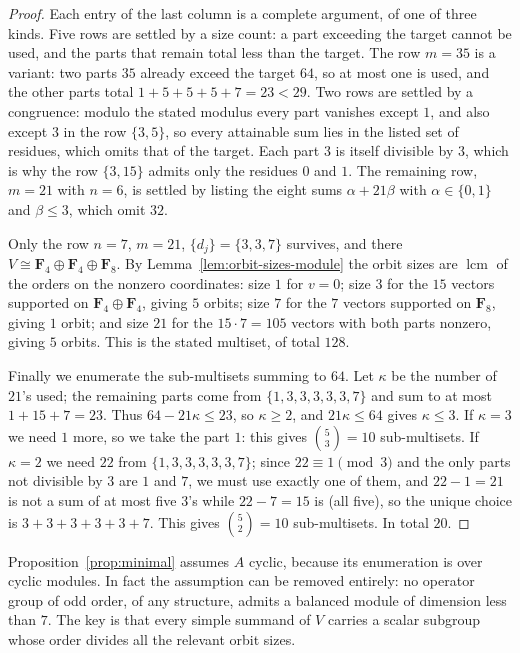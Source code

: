 \documentclass[11pt]{article}
\theoremstyle{definition}
\theoremstyle{remark}
\newcommand{\F}{\mathbf F}
\begin{document}
\begin{proof}
Each entry of the last column is a complete argument, of one of three
kinds.  Five rows are settled by a size count: a part exceeding the
target cannot be used, and the parts that remain total less than the
target.  The row $m=35$ is a variant: two parts $35$ already exceed the
target $64$, so at most one is used, and the other parts total
$1+5+5+5+7=23<29$.  Two rows are settled by a congruence: modulo the
stated modulus every part vanishes except $1$, and also except $3$ in
the row $\{3,5\}$, so every attainable sum lies in the listed set of
residues, which omits that of the target.  Each part $3$ is itself
divisible by $3$, which is why the row $\{3,15\}$ admits only the
residues $0$ and $1$.  The remaining row, $m=21$ with $n=6$, is settled by listing the
eight sums $\alpha+21\beta$ with $\alpha\in\{0,1\}$ and $\beta\le3$,
which omit $32$.

Only the row $n=7$, $m=21$, $\{d_j\}=\{3,3,7\}$ survives, and there
$V\cong\F_4\oplus\F_4\oplus\F_8$.  By
Lemma~\ref{lem:orbit-sizes-module} the orbit sizes are
$\operatorname{lcm}$ of the orders on the nonzero coordinates:
size $1$ for $v=0$; size $3$ for the $15$ vectors supported on
$\F_4\oplus\F_4$, giving $5$ orbits; size $7$ for the $7$ vectors
supported on $\F_8$, giving $1$ orbit; and size $21$ for the
$15\cdot7=105$ vectors with both parts nonzero, giving $5$ orbits.
This is the stated multiset, of total $128$.

Finally we enumerate the sub-multisets summing to $64$.  Let $\kappa$
be the number of $21$'s used; the remaining parts come from
$\{1,3,3,3,3,3,7\}$ and sum to at most $1+15+7=23$.  Thus
$64-21\kappa\le23$, so $\kappa\ge2$, and $21\kappa\le64$ gives
$\kappa\le3$.  If $\kappa=3$ we need $1$ more, so we take the part $1$:
this gives $\binom53=10$ sub-multisets.  If $\kappa=2$ we need $22$
from $\{1,3,3,3,3,3,7\}$; since $22\equiv1\pmod3$ and the only parts
not divisible by $3$ are $1$ and $7$, we must use exactly one of them,
and $22-1=21$ is not a sum of at most five $3$'s while $22-7=15$ is
(all five), so the unique choice is $3+3+3+3+3+7$.  This gives
$\binom52=10$ sub-multisets.  In total $20$.
\end{proof}

Proposition~\ref{prop:minimal} assumes $A$ cyclic, because its
enumeration is over cyclic modules.  In fact the assumption can be
removed entirely: no operator group of odd order, of any structure,
admits a balanced module of dimension less than $7$.  The key is that
every simple summand of $V$ carries a scalar subgroup whose order
divides all the relevant orbit sizes.
\end{document}
